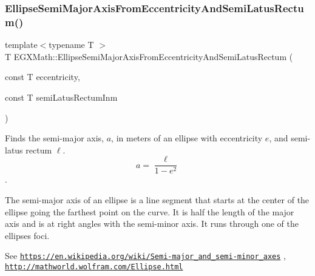 \mbox{\label{group___e_g_x_math-_geometry-2_d-_ellipse-_semi_major_axis_ga00e19efce15b74c6556cbd5650d7f699}} 
\subsubsection{\texorpdfstring{Ellipse\+Semi\+Major\+Axis\+From\+Eccentricity\+And\+Semi\+Latus\+Rectum()}{EllipseSemiMajorAxisFromEccentricityAndSemiLatusRectum()}}
{\footnotesize\ttfamily template$<$typename T $>$ \\
T E\+G\+X\+Math\+::\+Ellipse\+Semi\+Major\+Axis\+From\+Eccentricity\+And\+Semi\+Latus\+Rectum (\begin{DoxyParamCaption}\item[{const T}]{eccentricity,  }\item[{const T}]{semi\+Latus\+Rectum\+Inm }\end{DoxyParamCaption})}



Finds the semi-\/major axis, $a$, in meters of an ellipse with eccentricity $e$, and semi-\/latus rectum $\ell$. \[ a=\dfrac{\ell}{1 - e^2} \]. 

The semi-\/major axis of an ellipse is a line segment that starts at the center of the ellipse going the farthest point on the curve. It is half the length of the major axis and is at right angles with the semi-\/minor axis. It runs through one of the ellipses foci.

See \href{https://en.wikipedia.org/wiki/Semi-major_and_semi-minor_axes}{\tt https\+://en.\+wikipedia.\+org/wiki/\+Semi-\/major\+\_\+and\+\_\+semi-\/minor\+\_\+axes} , \href{http://mathworld.wolfram.com/Ellipse.html}{\tt http\+://mathworld.\+wolfram.\+com/\+Ellipse.\+html}


